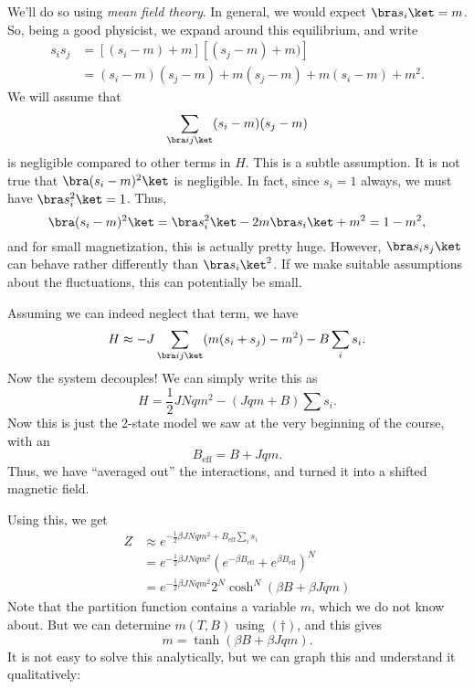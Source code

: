 \documentclass[a4paper]{article}
\begin{document}
We'll do so using \emph{mean field theory}. In general, we would expect $\bra s_i\ket = m$. So, being a good physicist, we expand around this equilibrium, and write
\begin{align*}
  s_i s_j &= [(s_i - m) + m][(s_j - m) + m)] \\
  &= (s_i - m)(s_j - m) + m (s_j - m) + m (s_i - m) + m^2.
\end{align*}
We will assume that
\[
  \sum_{\bra ij\ket} (s_i - m)(s_j - m)
\]
is negligible compared to other terms in $H$. This is a subtle assumption. It is not true that $\bra (s_i - m)^2 \ket$ is negligible. In fact, since $s_i = 1$ always, we must have $\bra s_i^2\ket = 1$. Thus,
\[
  \bra (s_i - m)^2\ket = \bra s_i^2\ket - 2m \bra s_i\ket + m^2 = 1 - m^2,
\]
and for small magnetization, this is actually pretty huge. However, $\bra s_i s_j\ket$ can behave rather differently than $\bra s_i\ket^2$. If we make suitable assumptions about the fluctuations, this can potentially be small.

Assuming we can indeed neglect that term, we have
\[
  H \approx - J \sum_{\bra i j\ket} (m(s_i + s_j) - m^2) - B \sum_i s_i.
\]
Now the system decouples! We can simply write this as
\[
  H = \frac{1}{2} J N qm^2 - (Jqm + B) \sum s_i.
\]
Now this is just the 2-state model we saw at the very beginning of the course, with an 
\[
  B_{\mathrm{eff}} = B + J qm.
\]
Thus, we have ``averaged out'' the interactions, and turned it into a shifted magnetic field.

Using this, we get
\begin{align*}
  Z &\approx e^{-\frac{1}{2} \beta J N q m^2 + B_{\mathrm{eff}}\sum_i s_i}\\
  &= e^{-\frac{1}{2} \beta J N q m^2} \left(e^{-\beta B_{\mathrm{eff}}} + e^{\beta B_{\mathrm{eff}}}\right)^N\\
  &= e^{-\frac{1}{2} \beta J N q m^2} 2^N \cosh^N (\beta B + \beta Jqm)
\end{align*}
Note that the partition function contains a variable $m$, which we do not know about. But we can determine $m(T, B)$ using $(\dagger)$, and this gives
\[
  m = \tanh (\beta B + \beta Jqm).\tag{$**$}
\]
It is not easy to solve this analytically, but we can graph this and understand it qualitatively:
\end{document}
